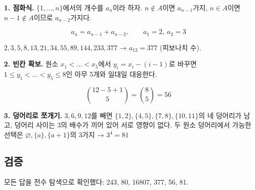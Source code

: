 \textbf{1. 점화식.} \(\{1,\dots,n\}\)에서의 개수를 \(a_n\)이라 하자.
\(n\notin A\)이면 \(a_{n-1}\)가지, \(n\in A\)이면 \(n-1\notin A\)이므로
\(a_{n-2}\)가지다.

\[
a_n=a_{n-1}+a_{n-2},\qquad a_1=2,\ a_2=3
\]

\(2,3,5,8,13,21,34,55,89,144,233,377\) → \(a_{12}=377\) (피보나치 수).

\textbf{2. 빈칸 확보.} 원소 \(x_1<\dots<x_5\)에서 \(y_i=x_i-(i-1)\)로
바꾸면 \(1\le y_1<\dots<y_5\le 8\)인 아무 5개와 일대일 대응한다.

\[
\binom{12-5+1}{5}=\binom85=56
\]

\textbf{3. 덩어리로 쪼개기.} \(3,6,9,12\)를 빼면
\(\{1,2\},\{4,5\},\{7,8\},\{10,11\}\)의 네 덩어리가 남고, 덩어리 사이는
3의 배수가 끼어 있어 서로 영향이 없다. 두 원소 덩어리에서 가능한 선택은
\(\varnothing,\{a\},\{a+1\}\)의 3가지 → \(3^4=81\)

\subsection{검증}

모든 답을 전수 탐색으로 확인했다: 243, 80, 16807, 377, 56, 81.
